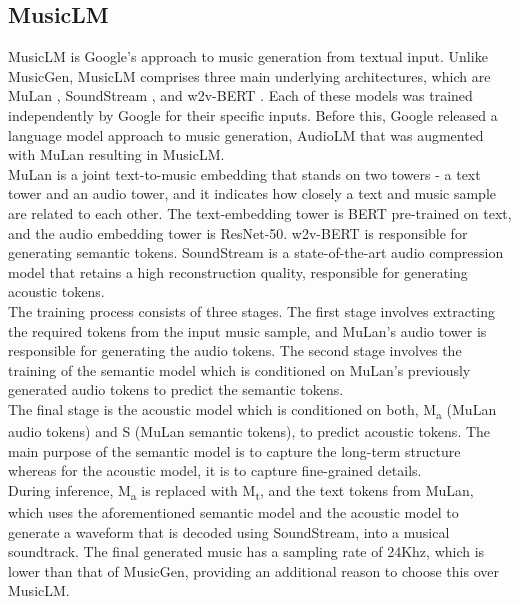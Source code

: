 \documentclass[conference]{IEEEtran}
\begin{document}
\subsection{MusicLM}
{
MusicLM \citep{agostinelli2023musiclm} is Google’s approach to music generation from textual input. Unlike MusicGen, MusicLM comprises three main underlying architectures, which are MuLan \citep{huang2022mulan}, SoundStream \citep{zeghidour2021soundstream}, and w2v-BERT \citep{chung2021w2v}. Each of these models was trained independently by Google for their specific inputs. Before this, Google released a language model approach to music generation, AudioLM \citep{borsos2023audiolm} that was augmented with MuLan resulting in MusicLM.
\\

MuLan is a joint text-to-music embedding that stands on two towers - a text tower and an audio tower, and it indicates how closely a text and music sample are related to each other. The text-embedding tower is BERT pre-trained on text, and the audio embedding tower is ResNet-50. w2v-BERT is responsible for generating semantic tokens. SoundStream is a state-of-the-art audio compression model that retains a high reconstruction quality, responsible for generating acoustic tokens.
\\

The training process consists of three stages. The first stage involves extracting the required tokens from the input music sample, and MuLan’s audio tower is responsible for generating the audio tokens. The second stage involves the training of the semantic model which is conditioned on MuLan’s previously generated audio tokens to predict the semantic tokens. 
\\

The final stage is the acoustic model which is conditioned on both, M\textsubscript{a} (MuLan audio tokens) and S (MuLan semantic tokens), to predict acoustic tokens. The main purpose of the semantic model is to capture the long-term structure whereas for the acoustic model, it is to capture fine-grained details.
\\

During inference, M\textsubscript{a} is replaced with M\textsubscript{t}, and the text tokens from MuLan, which uses the aforementioned semantic model and the acoustic model to generate a waveform that is decoded using SoundStream, into a musical soundtrack. The final generated music has a sampling rate of 24Khz, which is lower than that of MusicGen, providing an additional reason to choose this over MusicLM.
}
\end{document}
